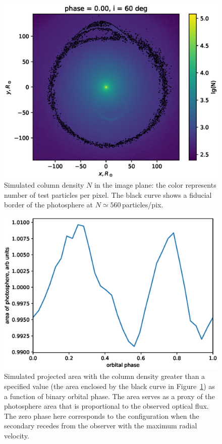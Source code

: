 \documentclass[twocolumn]{aastex631}
\begin{document}
\begin{figure}
    \centering
    \includegraphics[width=1.0\linewidth,clip=true,trim=0.97cm 0.0cm 1.75cm 0.5cm,angle=0]{2.75_ph0.eps}
    \caption{Simulated column density $N$ in the image plane: the color
    represents number of test particles per pixel. The black curve shows a
    fiducial border of the photosphere at $N\simeq560$\,particles/pix.}
    \label{fig:simulatedN}
\end{figure}
%
\begin{figure}
    \centering
        \includegraphics[width=1.0\linewidth,clip=true,trim=0.0cm 0cm 0cm 0cm,angle=0]{2.75_lc.eps}
\caption{Simulated projected area with the column density greater than 
a specified value (the area enclosed by the black curve in Figure~\ref{fig:simulatedN}) 
as a function of binary orbital phase. The area serves as a proxy of the photosphere area
that is proportional to the observed optical flux. 
The zero phase here corresponds to the configuration when the secondary recedes from the observer with the maximum radial velocity.} 
    \label{fig:simulatedlc}
\end{figure}
\end{document}
